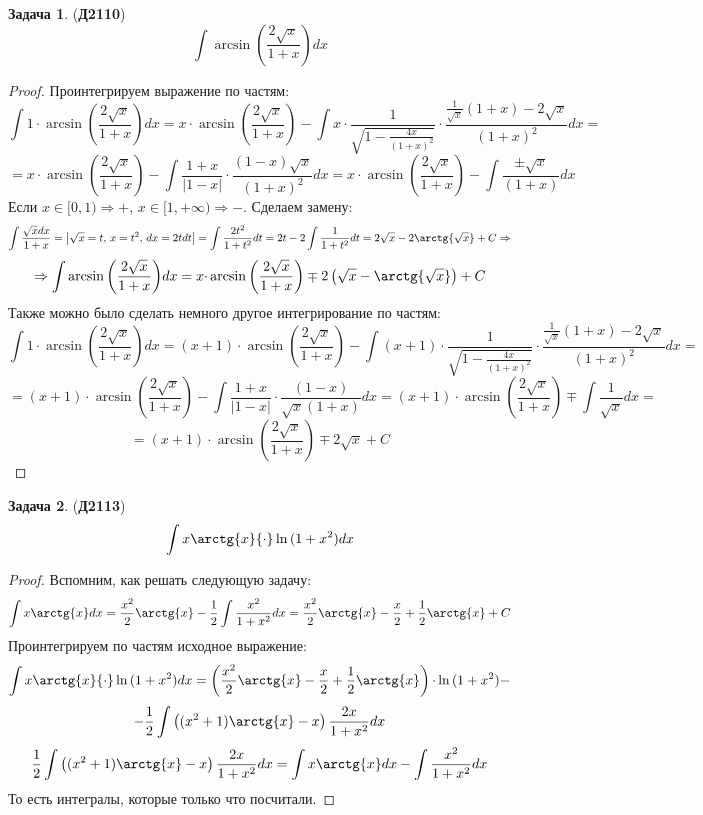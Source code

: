 \documentclass[12pt]{article}
\theoremstyle{definition}
\newtheorem{problem}{Задача}
\DeclareMathOperator{\dint}{\displaystyle\int}
\begin{document}
\begin{problem}(\textbf{Д2110})
	$$
		\dint \arcsin{\left(\dfrac{2\sqrt{x}}{1 + x}\right)}dx
	$$
\end{problem}
\begin{proof}
	Проинтегрируем выражение по частям:
	$$
		\dint 1{\cdot}\arcsin{\left(\dfrac{2\sqrt{x}}{1 + x}\right)}dx = x{\cdot}\arcsin{\left(\dfrac{2\sqrt{x}}{1 + x}\right)} - \dint x{\cdot}\dfrac{1}{\sqrt{1 - \tfrac{4x}{(1 +x)^2}}}{\cdot}   \dfrac{\tfrac{1}{\sqrt{x}}(1+x) - 2\sqrt{x}}{(1 + x)^2}dx = 
	$$
	$$
		=	x{\cdot}\arcsin{\left(\dfrac{2\sqrt{x}}{1 + x}\right)} - \dint \dfrac{1 + x}{|1 -x|}{\cdot}\dfrac{(1 - x)\sqrt{x}}{(1 + x)^2}dx = x{\cdot}\arcsin{\left(\dfrac{2\sqrt{x}}{1 + x}\right)} - \dint \dfrac{\pm\sqrt{x}}{(1 + x)}dx
	$$
	Если $x \in [0,1) \Rightarrow +, \, x \in [1,+\infty) \Rightarrow -$. Сделаем замену:
	$$
		\dint \dfrac{\sqrt{x}dx}{1 + x} = \left|\sqrt{x} = t, \, x = t^2, \, dx = 2t dt\right| = \dint \dfrac{2t^2}{1 +t^2}dt = 2t - 2\dint\dfrac{1}{1 + t^2}dt = 2\sqrt{x} - 2\arctg{\sqrt{x}} + C \Rightarrow
	$$
	$$
		\Rightarrow \dint \arcsin{\left(\dfrac{2\sqrt{x}}{1 + x}\right)}dx = x{\cdot}\arcsin{\left(\dfrac{2\sqrt{x}}{1 + x}\right)} \mp 2\left(\sqrt{x} - \arctg{\sqrt{x}}\right) + C
	$$
	Также можно было сделать немного другое интегрирование по частям:
	$$
		\dint 1{\cdot}\arcsin{\left(\dfrac{2\sqrt{x}}{1 + x}\right)}dx = ( x+1){\cdot}\arcsin{\left(\dfrac{2\sqrt{x}}{1 + x}\right)} - \dint (x+1){\cdot}\dfrac{1}{\sqrt{1 - \tfrac{4x}{(1 +x)^2}}}{\cdot}   \dfrac{\tfrac{1}{\sqrt{x}}(1+x) - 2\sqrt{x}}{(1 + x)^2}dx = 
	$$
	$$
		=	(x+1){\cdot}\arcsin{\left(\dfrac{2\sqrt{x}}{1 + x}\right)} - \dint \dfrac{1 + x}{|1 -x|}{\cdot}\dfrac{(1 - x)}{\sqrt{x}(1 + x)}dx = (x+1){\cdot}\arcsin{\left(\dfrac{2\sqrt{x}}{1 + x}\right)} \mp \dint \dfrac{1}{\sqrt{x}}dx=
	$$
	$$
		=	(x+1){\cdot}\arcsin{\left(\dfrac{2\sqrt{x}}{1 + x}\right)} \mp 2\sqrt{x} + C
	$$
\end{proof}
\begin{problem}(\textbf{Д2113})
	$$
		\dint x\arctg{x}{\cdot}\ln{(1 + x^2)}dx
	$$
\end{problem}
\begin{proof}
	Вспомним, как решать следующую задачу:
	$$
		\dint x\arctg{x}dx = \dfrac{x^2}{2}\arctg{x} - \dfrac{1}{2}\dint\dfrac{x^2}{1 + x^2}dx = \dfrac{x^2}{2}\arctg{x} - \dfrac{x}{2} + \dfrac{1}{2}\arctg{x} + C
	$$
	Проинтегрируем по частям исходное выражение:
	$$
		\dint x\arctg{x}{\cdot}\ln{(1 + x^2)}dx = \left(\dfrac{x^2}{2}\arctg{x} - \dfrac{x}{2} + \dfrac{1}{2}\arctg{x}\right){\cdot}\ln{(1 + x^2)} -
	$$
	$$
		-\dfrac{1}{2}\dint \left( (x^2 + 1)\arctg{x} - x \right)\dfrac{2x}{1 + x^2}dx
	$$
	$$
		\dfrac{1}{2}\dint \left( (x^2 + 1)\arctg{x} - x \right)\dfrac{2x}{1 + x^2}dx = \dint x\arctg{x}dx - \dint \dfrac{x^2}{1 +x^2}dx 
	$$
	То есть интегралы, которые только что посчитали.
\end{proof}
\end{document}
